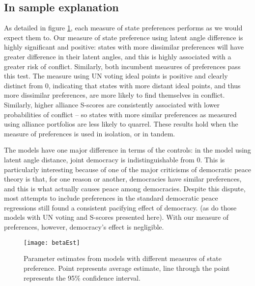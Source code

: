 \subsection{In sample explanation}
As detailed in figure \ref{fig:coefP}, each measure of state preferences performs as we would expect them to. Our measure of state preference using latent angle difference is highly significant and positive: states with more dissimilar preferences will have greater difference in their latent angles, and this is highly associated with a greater risk of conflict. Similarly, both incumbent measures of preferences pass this test. The measure using UN voting ideal points is positive and clearly distinct from $0$, indicating that states with more distant ideal points, and thus more dissimilar preferences, are more likely to find themselves in conflict. Similarly, higher alliance S-scores are consistently associated with lower probabilities of conflict -- so states with more similar preferences as measured using alliance portfolios are less likely to quarrel. These results hold when the measure of preferences is used in isolation, or in tandem.

The models have one major difference in terms of the controls: in the model using latent angle distance, joint democracy is indistinguishable from $0$. This is particularly interesting because of one of the major criticisms of democratic peace theory is that, for one reason or another, democracies have similar preferences, and this is what actually causes peace among democracies.  Despite this dispute, most attempts to include preferences in the standard democratic peace regressions still found a consistent pacifying effect of democracy.
(as do those models with UN voting and S-scores presented here). With our measure of preferences, however, democracy's effect is negligible.


\begin{figure}[ht]
	\centering
	\texttt{[image: betaEst]}
	\caption{Parameter estimates from models with different measures of state preference. Point represents average estimate, line through the point represents the 95\% confidence interval.}
	\label{fig:coefP}
\end{figure}
\FloatBarrier

